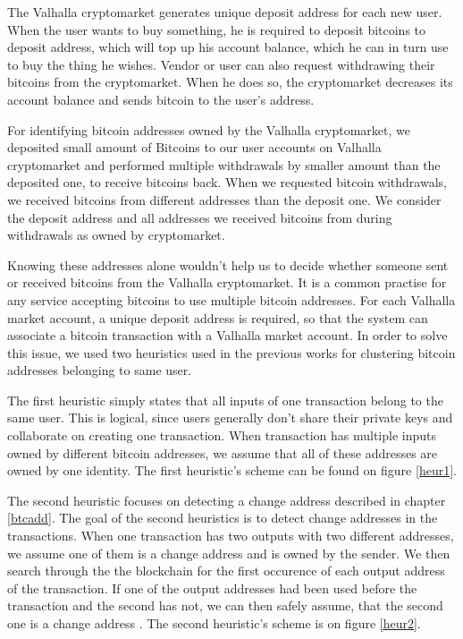 \documentclass[
  digital, %
  table,   %
  lof,     %
  lot,     %
  oneside
]{fithesis3}
\begin{document}
The Valhalla cryptomarket generates unique deposit address for each new user.
When the user wants to buy something, he is required to deposit bitcoins to deposit address,
which will top up his account balance, which he can in turn use to buy the thing he wishes.
Vendor or user can also request withdrawing their bitcoins from the cryptomarket. When he does so,
the cryptomarket decreases its account balance and sends bitcoin to the user's address.

For identifying bitcoin addresses owned by the Valhalla cryptomarket, we 
deposited small amount of Bitcoins to our user accounts on Valhalla cryptomarket and
performed multiple withdrawals by smaller amount than the deposited one, to receive bitcoins back.
When we requested bitcoin withdrawals, we received bitcoins from different addresses
than the deposit one. We consider the deposit address and all addresses we received
bitcoins from during withdrawals as owned by cryptomarket.

Knowing these addresses alone wouldn't help us to decide
whether someone sent or received bitcoins from the Valhalla cryptomarket.
It is a common practise for any service accepting bitcoins to
use multiple bitcoin addresses.
For each Valhalla market account,
a unique deposit address is required, so that the system can associate
a bitcoin transaction with a Valhalla market account.
In order to solve this issue, we used two heuristics used
in the previous works \parencite{androulaki2013evaluating}\parencite{reid2013analysis}
for clustering bitcoin addresses belonging to same user.

The first heuristic simply states that all inputs of one transaction belong to the same user. This is logical,
since users generally don't share their private keys and collaborate on creating one transaction.
When transaction has multiple inputs owned by different bitcoin addresses, we assume that all of these addresses are owned by
one identity. The first heuristic's scheme can be found on figure \ref{heur1}.

The second heuristic focuses on detecting a change address described in chapter \ref{btcadd}.
The goal of the second heuristics is to detect change addresses in the transactions.
When one transaction has two outputs with two different addresses, we assume one of them is a change
address and is owned by the sender.
We then search through the the blockchain for the first occurence of each output address of the 
transaction. If one of the output addresses had been used before the transaction and the second has not,
we can then safely assume, that the second one is a change address \parencite{androulaki2013evaluating}.
The second heuristic's scheme is on figure \ref{heur2}.
\end{document}
